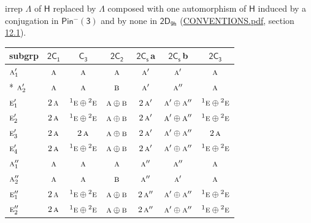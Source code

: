 \documentclass[10pt,a4paper]{article}
\numberwithin{equation}{section}
\newcommand{\grp}[1]{\mathsf{#1}}
\newcommand{\irr}[1]{\text{\normalfont\scshape #1}}
\newcommand{\conjpair}[1]{{}^{#1}}
\newcommand{\clsletter}[1]{\,{\scriptsize\color{black!55}#1}}
\begin{document}
irrep $\Lambda$ of $\grp{H}$ replaced by $\Lambda$ composed with one automorphism of $\grp{H}$ induced by a conjugation in \href{Pinminus3.pdf}{$\grp{Pin^{-}(3)}$} and by none in $\grp{2D_{9h}}$ (\href{../../CONVENTIONS.pdf}{CONVENTIONS.pdf}, section \href{../../../rotation/CONVENTIONS.pdf\#conv.12.1}{12.1}).
{\small\begin{longtable}{@{}lcccccc@{}}\toprule
subgrp & \href{2C1.pdf}{$\grp{2C_{1}}$} & \href{C3.pdf}{$\grp{C_{3}}$} & \href{2C2.pdf}{$\grp{2C_{2}}$} & \href{2C1v.pdf}{$\grp{2C_{s}}$}\clsletter{a} & \href{2C1v.pdf}{$\grp{2C_{s}}$}\clsletter{b} & \href{2C3.pdf}{$\grp{2C_{3}}$}\\\midrule\endhead
\bottomrule\endfoot\endlastfoot
$\irr{a}_{1}'$ & $\irr{a}$ & $\irr{a}$ & $\irr{a}$ & $\irr{a}'$ & $\irr{a}'$ & $\irr{a}$\\*
$\irr{a}_{2}'$ & $\irr{a}$ & $\irr{a}$ & $\irr{b}$ & $\irr{a}'$ & $\irr{a}''$ & $\irr{a}$\\
$\irr{e}_{1}'$ & $2\,\irr{a}$ & $\conjpair{1}\irr{e}\oplus \conjpair{2}\irr{e}$ & $\irr{a}\oplus \irr{b}$ & $2\,\irr{a}'$ & $\irr{a}'\oplus \irr{a}''$ & $\conjpair{1}\irr{e}\oplus \conjpair{2}\irr{e}$\\
$\irr{e}_{2}'$ & $2\,\irr{a}$ & $\conjpair{1}\irr{e}\oplus \conjpair{2}\irr{e}$ & $\irr{a}\oplus \irr{b}$ & $2\,\irr{a}'$ & $\irr{a}'\oplus \irr{a}''$ & $\conjpair{1}\irr{e}\oplus \conjpair{2}\irr{e}$\\
$\irr{e}_{3}'$ & $2\,\irr{a}$ & $2\,\irr{a}$ & $\irr{a}\oplus \irr{b}$ & $2\,\irr{a}'$ & $\irr{a}'\oplus \irr{a}''$ & $2\,\irr{a}$\\
$\irr{e}_{4}'$ & $2\,\irr{a}$ & $\conjpair{1}\irr{e}\oplus \conjpair{2}\irr{e}$ & $\irr{a}\oplus \irr{b}$ & $2\,\irr{a}'$ & $\irr{a}'\oplus \irr{a}''$ & $\conjpair{1}\irr{e}\oplus \conjpair{2}\irr{e}$\\
$\irr{a}_{1}''$ & $\irr{a}$ & $\irr{a}$ & $\irr{a}$ & $\irr{a}''$ & $\irr{a}''$ & $\irr{a}$\\
$\irr{a}_{2}''$ & $\irr{a}$ & $\irr{a}$ & $\irr{b}$ & $\irr{a}''$ & $\irr{a}'$ & $\irr{a}$\\
$\irr{e}_{1}''$ & $2\,\irr{a}$ & $\conjpair{1}\irr{e}\oplus \conjpair{2}\irr{e}$ & $\irr{a}\oplus \irr{b}$ & $2\,\irr{a}''$ & $\irr{a}'\oplus \irr{a}''$ & $\conjpair{1}\irr{e}\oplus \conjpair{2}\irr{e}$\\
$\irr{e}_{2}''$ & $2\,\irr{a}$ & $\conjpair{1}\irr{e}\oplus \conjpair{2}\irr{e}$ & $\irr{a}\oplus \irr{b}$ & $2\,\irr{a}''$ & $\irr{a}'\oplus \irr{a}''$ & $\conjpair{1}\irr{e}\oplus \conjpair{2}\irr{e}$\\

\end{longtable}}
\end{document}
